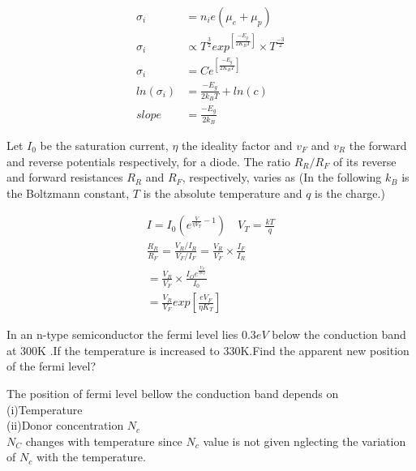 \begin{enumerate}[label=\color{futuringtheme}\textbf{\arabic*.}]
\begin{minipage}{\textwidth}
	\end{minipage}
	\begin{answer}
		\begin{align*}
		\sigma_{i}&=n_{i}e(\mu_{e}+\mu_{p})\\
		\sigma_{i}&\propto T^{\frac{3}{2}}exp^{\left[ \frac{-E_g}{2K_BT}\right] } \times T^{\frac{-3}{2}}\\
		\sigma_{i}&=Ce^{\left[ \frac{-E_g}{2K_BT}\right]}\\
		ln(\sigma_{i})&=\frac{-E_g}{2k_BT}+ln(c)\\
		slope&=\frac{-E_g}{2k_B}
		\end{align*}	
	\end{answer}
	\begin{minipage}{\textwidth}
		\item {\normalsize }Let $I_{0}$ be the saturation current, $\eta$ the ideality factor and $v_{F}$ and $v_{R}$ the forward and reverse potentials respectively, for a diode. The ratio $R_{R} / R_{F}$ of its reverse and forward resistances $R_{R}$ and $R_{F}$, respectively, varies as (In the following $k_{B}$ is the Boltzmann constant, $T$ is the absolute temperature and $q$ is the charge.)
	\end{minipage}
	\begin{answer}
		\begin{align*}
		I=I_{0}\left( e^{\frac{V}{\eta V_T}-1}\right)  \quad V_T=\frac{kT}{q}\\
		\frac{R_R}{R_F}=\frac{V_R/I_R}{V_F/I_F}=\frac{V_R}{V_F}\times \frac{I_F}{I_R}\\
		=\frac{V_R}{V_F}\times \frac{I_{O}e^{\frac{V_F}{\eta V_T}}}{I_{0}}\\
		=\frac{V_R}{V_F}exp\left[ \frac{eV_F}{\eta K_T}\right] 
		\end{align*}
	\end{answer}
	\begin{minipage}{\textwidth}
		\item In an n-type semiconductor the fermi level lies $0.3eV$ below the conduction band at 300K .If the temperature is increased to 330K.Find the apparent new position of the fermi level?
	\end{minipage}
	\begin{answer}
		The position of fermi level bellow the conduction band depends on \\
		(i)Temperature \\
		(ii)Donor concentration $N_c$\\
		$N_C$ changes with temperature since $N_c$ value is not given nglecting the variation of $N_c$ with the temperature.\\

\end{answer}
\end{enumerate}

